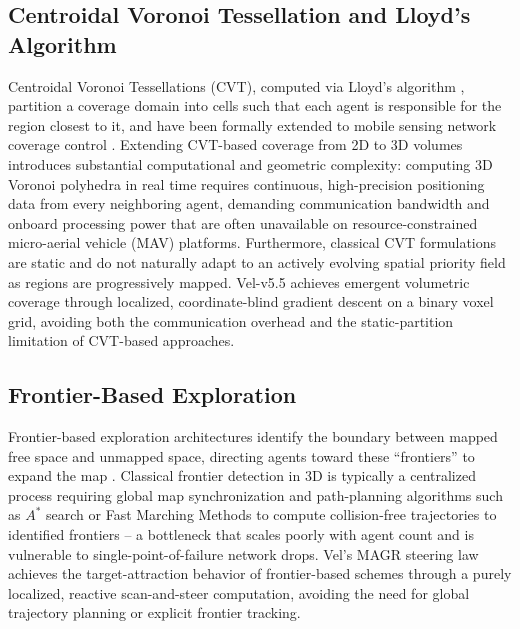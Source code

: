 \documentclass[10pt,journal]{IEEEtran}
\begin{document}
\subsection{Centroidal Voronoi Tessellation and Lloyd's Algorithm}
Centroidal Voronoi Tessellations (CVT), computed via Lloyd's algorithm
\cite{lloyd1982}, partition a coverage domain into cells such that each
agent is responsible for the region closest to it, and have been formally
extended to mobile sensing network coverage control \cite{cortes2004}.
Extending CVT-based coverage from 2D to 3D volumes introduces substantial
computational and geometric complexity: computing 3D Voronoi polyhedra in
real time requires continuous, high-precision positioning data from every
neighboring agent, demanding communication bandwidth and onboard processing
power that are often unavailable on resource-constrained micro-aerial
vehicle (MAV) platforms. Furthermore, classical CVT formulations are
static and do not naturally adapt to an actively evolving spatial priority
field as regions are progressively mapped. Vel-v5.5 achieves emergent
volumetric coverage through localized, coordinate-blind gradient descent
on a binary voxel grid, avoiding both the communication overhead and the
static-partition limitation of CVT-based approaches.

\subsection{Frontier-Based Exploration}
Frontier-based exploration architectures identify the boundary between
mapped free space and unmapped space, directing agents toward these
``frontiers'' to expand the map \cite{yamauchi1997}. Classical frontier
detection in 3D is typically a centralized process requiring global map
synchronization and path-planning algorithms such as $A^*$ search or Fast
Marching Methods to compute collision-free trajectories to identified
frontiers -- a bottleneck that scales poorly with agent count and is
vulnerable to single-point-of-failure network drops. Vel's MAGR steering
law achieves the target-attraction behavior of frontier-based schemes
through a purely localized, reactive scan-and-steer computation, avoiding
the need for global trajectory planning or explicit frontier tracking.
\end{document}
